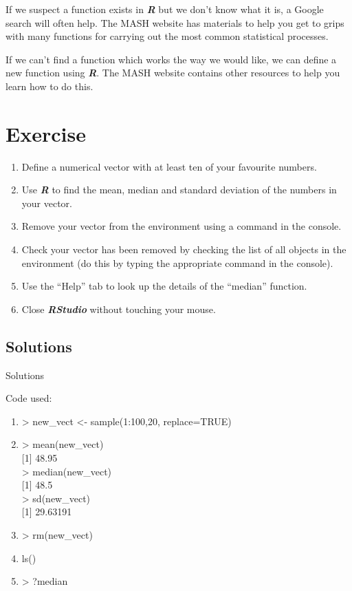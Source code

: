 \documentclass[
]{book}
\providecommand{\tightlist}{%
  \setlength{\itemsep}{0pt}\setlength{\parskip}{0pt}}
\begin{document}
If we suspect a function exists in \textbf{\emph{R}} but we don't know what it is, a Google search will often help. The MASH website has materials to help you get to grips with many functions for carrying out the most common statistical processes.

If we can't find a function which works the way we would like, we can define a new function using \textbf{\emph{R}}. The MASH website contains other resources to help you learn how to do this.

\section{Exercise}\label{exercise-2}

\begin{enumerate}
\def\labelenumi{\arabic{enumi}.}
\tightlist
\item
  Define a numerical vector with at least ten of your favourite numbers.
\item
  Use \textbf{\emph{R}} to find the mean, median and standard deviation of the numbers in your vector.
\item
  Remove your vector from the environment using a command in the console.
\item
  Check your vector has been removed by checking the list of all objects in the environment (do this by typing the appropriate command in the console).
\item
  Use the ``Help'' tab to look up the details of the ``median'' function.
\item
  Close \textbf{\emph{RStudio}} without touching your mouse.
\end{enumerate}

\subsection{Solutions}\label{solutions-2}

Solutions

Code used:

\begin{enumerate}
\def\labelenumi{\arabic{enumi}.}
\item
  \textgreater{} new\_vect \textless- sample(1:100,20, replace=TRUE)
\item
  \textgreater{} mean(new\_vect)\\
  {[}1{]} 48.95\\
  \textgreater{} median(new\_vect)\\
  {[}1{]} 48.5\\
  \textgreater{} sd(new\_vect)\\
  {[}1{]} 29.63191
\item
  \textgreater{} rm(new\_vect)
\item
  ls()
\item
  \textgreater{} ?median
\end{enumerate}
\end{document}
